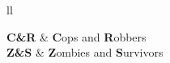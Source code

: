 \documentclass[
11pt, %
english, %
singlespacing, %
headsepline, %
]{MastersDoctoralThesis} %
\theoremstyle{definition}
\begin{document}
\tableofcontents %

\listoffigures %

\listoftables %


\begin{abbreviations}{ll} %

\textbf{C\&R} & \textbf{C}ops and \textbf{R}obbers\\
\textbf{Z\&S} & \textbf{Z}ombies and \textbf{S}urvivors\\

\end{abbreviations}









\end{document}
